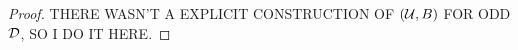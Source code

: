 \begin{proof}
    
    
    
    THERE WASN'T A EXPLICIT CONSTRUCTION OF $(\mathcal U, B)$ FOR ODD $\mathcal{D}$, SO I DO IT HERE.
    

\end{proof}
